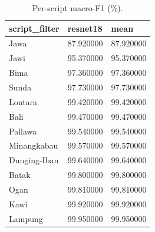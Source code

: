 \begin{table}[t]
\centering
\caption{Per-script macro-F1 (\%).}
\label{tab:per_script}
\begin{tabular}{lll}
\toprule
script\_filter & resnet18 & mean \\
\midrule
Jawa & 87.920000 & 87.920000 \\
Jawi & 95.370000 & 95.370000 \\
Bima & 97.360000 & 97.360000 \\
Sunda & 97.730000 & 97.730000 \\
Lontara & 99.420000 & 99.420000 \\
Bali & 99.470000 & 99.470000 \\
Pallawa & 99.540000 & 99.540000 \\
Minangkabau & 99.570000 & 99.570000 \\
Dunging-Iban & 99.640000 & 99.640000 \\
Batak & 99.800000 & 99.800000 \\
Ogan & 99.810000 & 99.810000 \\
Kawi & 99.920000 & 99.920000 \\
Lampung & 99.950000 & 99.950000 \\
\bottomrule
\end{tabular}
\end{table}
